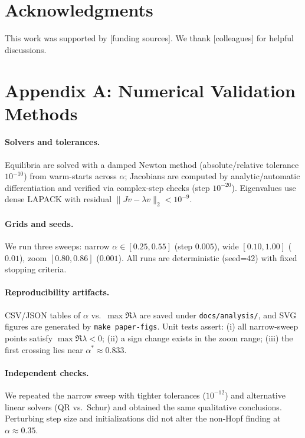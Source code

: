 \documentclass[11pt,twocolumn]{article}
\begin{document}
\section*{Acknowledgments}

This work was supported by [funding sources]. We thank [colleagues] for helpful discussions.




\appendix

\section*{Appendix A: Numerical Validation Methods}
\label{app:numerics}

\paragraph{Solvers and tolerances.}
Equilibria are solved with a damped Newton method (absolute/relative tolerance $10^{-10}$) from warm-starts across $\alpha$; Jacobians are computed by analytic/automatic differentiation and verified via complex-step checks (step $10^{-20}$). Eigenvalues use dense LAPACK with residual $\|\!Jv-\lambda v\!\|_2 < 10^{-9}$.

\paragraph{Grids and seeds.}
We run three sweeps: narrow $\alpha\!\in\![0.25,0.55]$ (step $0.005$), wide $[0.10,1.00]$ ($0.01$), zoom $[0.80,0.86]$ ($0.001$). All runs are deterministic (seed=42) with fixed stopping criteria.

\paragraph{Reproducibility artifacts.}
CSV/JSON tables of $\alpha$ vs.\ $\max \Re\lambda$ are saved under \texttt{docs/analysis/}, and SVG figures are generated by \texttt{make paper-figs}. Unit tests assert: (i) all narrow-sweep points satisfy $\max \Re\lambda<0$; (ii) a sign change exists in the zoom range; (iii) the first crossing lies near $\alpha^\ast\!\approx\!0.833$.

\paragraph{Independent checks.}
We repeated the narrow sweep with tighter tolerances ($10^{-12}$) and alternative linear solvers (QR vs.\ Schur) and obtained the same qualitative conclusions. Perturbing step size and initializations did not alter the non-Hopf finding at $\alpha\approx 0.35$.
\end{document}
